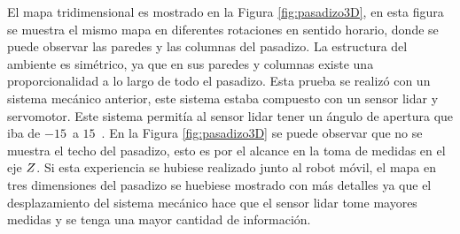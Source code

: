 
El mapa tridimensional es mostrado en la Figura \ref{fig:pasadizo3D}, en esta 
figura se muestra el mismo mapa en diferentes rotaciones en sentido horario, 
donde se puede observar las paredes y las columnas del pasadizo. La estructura 
del ambiente es simétrico, ya que en sus paredes y columnas existe una 
proporcionalidad a lo largo de todo el pasadizo. Esta prueba se realizó con 
un sistema mecánico anterior, este sistema estaba compuesto con un sensor lidar 
y servomotor. Este sistema permitía al sensor lidar tener un ángulo de apertura 
que iba de $-15$~\grad a $15$~\grad. En la Figura \ref{fig:pasadizo3D} se
puede observar que no se muestra el techo del pasadizo, esto es por el alcance en 
la toma de medidas en el eje $\mathnormal Z$. Si esta experiencia se hubiese realizado 
junto al robot móvil, el mapa en tres dimensiones del pasadizo se huebiese mostrado
con más detalles ya que el desplazamiento del sistema mecánico hace que el sensor
lidar tome mayores medidas y se tenga una mayor cantidad de información.



